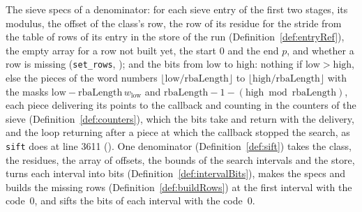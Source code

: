 \begin{definition}\label{def:siftBits}
  \leanok
  The sieve specs of a denominator: for each sieve entry of the first two stages, its modulus, the
  offset of the class's row, the row of its residue for the stride from the table of rows of its
  entry in the store of the run (Definition~\ref{def:entryRef}), the empty array for a row not built
  yet, the start $0$ and the end $p$, and whether a row is missing (\verb|set_rows|,
  ); and the bits from $\mathrm{low}$ to $\mathrm{high}$: nothing
  if $\mathrm{low} > \mathrm{high}$, else the pieces of the word numbers
  $\lfloor \mathrm{low}/\mathrm{rbaLength}\rfloor$ to
  $\lfloor \mathrm{high}/\mathrm{rbaLength}\rfloor$ with the masks
  $\mathrm{low} - \mathrm{rbaLength}\, w_{\mathrm{low}}$ and
  $\mathrm{rbaLength} - 1 - (\mathrm{high} \bmod \mathrm{rbaLength})$, each piece delivering its
  points to the callback and counting in the counters of the sieve (Definition~\ref{def:counters}),
  which the bits take and return with the delivery, and the loop returning after a piece at which
  the callback stopped the search, as \verb|sift| does at line 3611
  (). One denominator (Definition~\ref{def:sift}) takes the
  class, the residues, the array of offsets, the bounds of the search intervals and the store, turns
  each interval into bits (Definition~\ref{def:intervalBits}), makes the specs and builds the
  missing rows (Definition~\ref{def:buildRows}) at the first interval with the code~$0$, and sifts
  the bits of each interval with the code~$0$.
\end{definition}

